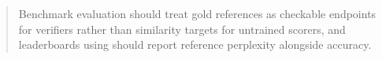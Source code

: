 \begin{abstract}
Benchmark evaluation should treat gold references as checkable endpoints for verifiers rather than similarity targets for untrained scorers, and leaderboards using \tfa{} should report reference perplexity alongside accuracy.
\end{abstract}

